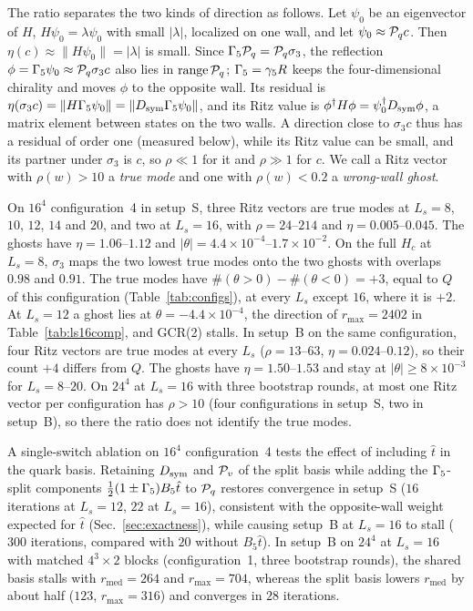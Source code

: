The ratio separates the two kinds of direction as follows. Let $\psi_0$ be an eigenvector of $H$,
$H\psi_0=\lambda\psi_0$ with small $|\lambda|$, localized on one wall, and let $\psi_0\approx\mathcal P_q c$.
Then $\eta(c)\approx\|H\psi_0\|=|\lambda|$ is small. Since $\Gamma_5\mathcal P_q=\mathcal P_q\sigma_3$, the reflection
$\phi=\Gamma_5\psi_0\approx\mathcal P_q\sigma_3c$ also lies in $\operatorname{range}\mathcal P_q$; $\Gamma_5=\gamma_5R$
keeps the four-dimensional chirality and moves $\phi$ to the opposite wall. Its residual is
$\eta(\sigma_3c)=\|H\Gamma_5\psi_0\|=\|D_{\mathrm{sym}}\Gamma_5\psi_0\|$, and its Ritz value is
$\phi^{\dagger} H\phi=\psi_0^{\dagger}D_{\mathrm{sym}}\phi$, a matrix element between states on the two walls. A direction
close to $\sigma_3c$ thus has a residual of order one (measured below), while its Ritz value can be
small, and its partner under $\sigma_3$ is $c$, so $\rho\ll1$ for it and $\rho\gg1$ for $c$. We call a Ritz vector with $\rho(w)>10$ a \emph{true mode} and one with
$\rho(w)<0.2$ a \emph{wrong-wall ghost}.

On $16^4$ configuration~4 in setup~S, three Ritz vectors are true modes at $L_s=8$, $10$, $12$,
$14$ and $20$, and two at $L_s=16$, with $\rho=24$--$214$ and $\eta=0.005$--$0.045$. The ghosts have
$\eta=1.06$--$1.12$ and $|\theta|=4.4\times10^{-4}$--$1.7\times10^{-2}$. On the full $H_c$ at
$L_s=8$, $\sigma_3$ maps the two lowest true modes onto the two ghosts with overlaps $0.98$ and
$0.91$. The true modes have $\#(\theta>0)-\#(\theta<0)=+3$, equal to $Q$ of this configuration
(Table~\ref{tab:configs}), at every $L_s$ except $16$, where it is $+2$. At $L_s=12$ a ghost lies at
$\theta=-4.4\times10^{-4}$, the direction of $r_{\max}=2402$ in Table~\ref{tab:ls16comp}, and
GCR(2) stalls. In setup~B on the same configuration, four Ritz vectors are true modes at every
$L_s$ ($\rho=13$--$63$, $\eta=0.024$--$0.12$), so their count $+4$ differs from $Q$. The ghosts
have $\eta=1.50$--$1.53$ and stay at $|\theta|\ge8\times10^{-3}$ for $L_s=8$--$20$. On
$24^4$ at $L_s=16$ with three bootstrap rounds, at most one Ritz vector per configuration has
$\rho>10$ (four configurations in setup~S, two in setup~B), so there the ratio does not identify
the true modes.

A single-switch ablation on $16^4$ configuration~4 tests the effect of including $\hat t$ in the
quark basis. Retaining $D_{\mathrm{sym}}$ and $\mathcal P_v$ of the split basis while adding the $\Gamma_5$-split
components $\frac12(1\pm\Gamma_5)B_5\hat t$ to $\mathcal P_q$ restores convergence in setup~S ($16$
iterations at $L_s=12$, $22$ at $L_s=16$), consistent with the opposite-wall weight expected for
$\hat t$ (Sec.~\ref{sec:exactness}), while causing setup~B at $L_s=16$ to stall ($300$ iterations,
compared with $20$ without $B_5\hat t$). In setup~B on $24^4$ at $L_s=16$ with matched $4^3\times2$
blocks (configuration~1, three bootstrap rounds), the shared basis stalls with
$r_{\mathrm{med}}=264$ and $r_{\max}=704$, whereas the split basis lowers $r_{\mathrm{med}}$ by
about half ($123$, $r_{\max}=316$) and converges in $28$ iterations.

